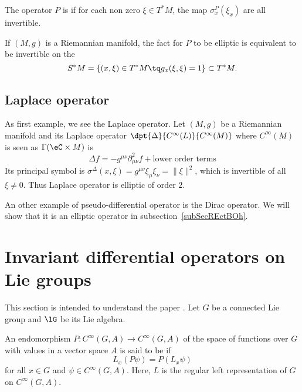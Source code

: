\begin{definition}  \label{DefGLpDEHy}
	The operator $P$ is  if for each non zero $\xi\in T^*M$, the map $\sigma_x^P(\xi_x)$ are all invertible.
\end{definition}

If $(M,g)$ is a Riemannian manifold, the fact for $P$ to be elliptic is equivalent to be invertible on the 
\[
	S^*M=\{ (x,\xi)\in T^*M\tq g_x(\xi,\xi)=1 \}\subset T^*M.
\]

\subsection{Laplace operator}

As first example, we see the Laplace operator. Let $(M,g)$ be a Riemannian manifold and its Laplace operator $\dpt{ \Delta }{  C^{\infty}(L) }{  C^{\infty}(M) }$ where $ C^{\infty}(M)$ is seen as $\Gamma(\eC\times M)$ is
\[
	\Delta f=-g^{\mu\nu}\partial^2_{\mu\nu}f+\text{lower order terms}
\]
Its principal symbol is $\sigma^{\Delta}(x,\xi)=g^{\mu\nu}\xi_{\mu}\xi_{\nu}=\| \xi \|^2$, which is invertible of all $\xi\neq 0$. Thus Laplace operator is elliptic of order $2$.

An other example of pseudo-differential operator is the Dirac operator. We will show that it is an elliptic operator in subsection~\ref{subSecREctBOh}.

\section{Invariant differential operators on Lie groups}

This section is intended to understand the paper \cite{QuantifKhalerian}. Let $G$ be a connected Lie group and $\lG$ be its Lie algebra.

An endomorphism $P\colon C^{\infty}(G,A)\to  C^{\infty}(G,A)$ of the space of functions over $G$ with values in a vector space $A$ is said to be  if
\begin{equation}  \label{EqDefLxinvarop}
	L_{x}(P\psi)=P(L_{x}\psi)
\end{equation}
for all $x\in G$ and $\psi\in C^{\infty}(G,A)$. Here, $L$ is the regular left representation of $G$ on $ C^{\infty}(G,A)$.

